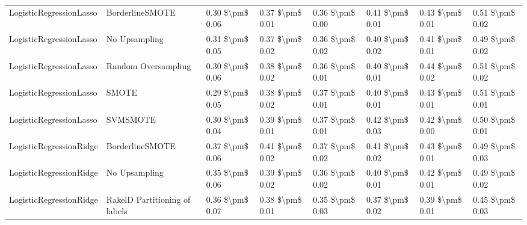 \begin{tabular}{llllllll}
        LogisticRegressionLasso &               BorderlineSMOTE & 0.30 \$\textbackslash pm\$ 0.06 &           0.37 \$\textbackslash pm\$ 0.01 &       0.36 \$\textbackslash pm\$ 0.00 &        0.41 \$\textbackslash pm\$ 0.01 &                         0.43 \$\textbackslash pm\$ 0.01 &     0.51 \$\textbackslash pm\$ 0.02 \\
        LogisticRegressionLasso &                 No Upsampling & 0.31 \$\textbackslash pm\$ 0.05 &           0.37 \$\textbackslash pm\$ 0.02 &       0.36 \$\textbackslash pm\$ 0.02 &        0.40 \$\textbackslash pm\$ 0.02 &                         0.41 \$\textbackslash pm\$ 0.01 &     0.49 \$\textbackslash pm\$ 0.02 \\
        LogisticRegressionLasso &           Random Oversampling & 0.30 \$\textbackslash pm\$ 0.06 &           0.38 \$\textbackslash pm\$ 0.02 &       0.36 \$\textbackslash pm\$ 0.01 &        0.40 \$\textbackslash pm\$ 0.01 &                         0.44 \$\textbackslash pm\$ 0.02 &     0.51 \$\textbackslash pm\$ 0.02 \\
        LogisticRegressionLasso &                         SMOTE & 0.29 \$\textbackslash pm\$ 0.05 &           0.38 \$\textbackslash pm\$ 0.02 &       0.37 \$\textbackslash pm\$ 0.01 &        0.40 \$\textbackslash pm\$ 0.01 &                         0.43 \$\textbackslash pm\$ 0.01 &     0.51 \$\textbackslash pm\$ 0.01 \\
        LogisticRegressionLasso &                      SVMSMOTE & 0.30 \$\textbackslash pm\$ 0.04 &           0.39 \$\textbackslash pm\$ 0.01 &       0.37 \$\textbackslash pm\$ 0.01 &        0.42 \$\textbackslash pm\$ 0.03 &                         0.42 \$\textbackslash pm\$ 0.00 &     0.50 \$\textbackslash pm\$ 0.01 \\
        LogisticRegressionRidge &               BorderlineSMOTE & 0.37 \$\textbackslash pm\$ 0.06 &           0.41 \$\textbackslash pm\$ 0.02 &       0.37 \$\textbackslash pm\$ 0.02 &        0.41 \$\textbackslash pm\$ 0.02 &                         0.43 \$\textbackslash pm\$ 0.01 &     0.49 \$\textbackslash pm\$ 0.03 \\
        LogisticRegressionRidge &                 No Upsampling & 0.35 \$\textbackslash pm\$ 0.06 &           0.39 \$\textbackslash pm\$ 0.02 &       0.36 \$\textbackslash pm\$ 0.02 &        0.40 \$\textbackslash pm\$ 0.01 &                         0.42 \$\textbackslash pm\$ 0.01 &     0.49 \$\textbackslash pm\$ 0.02 \\
        LogisticRegressionRidge & RakelD Partitioning of labels & 0.36 \$\textbackslash pm\$ 0.07 &           0.38 \$\textbackslash pm\$ 0.01 &       0.35 \$\textbackslash pm\$ 0.03 &        0.37 \$\textbackslash pm\$ 0.02 &                         0.39 \$\textbackslash pm\$ 0.01 &     0.45 \$\textbackslash pm\$ 0.03 \\

\end{tabular}
